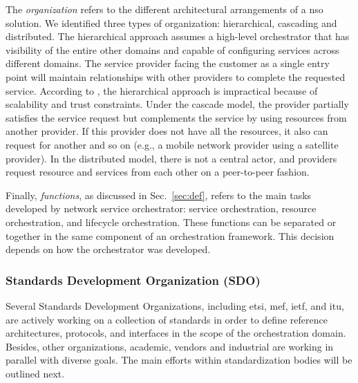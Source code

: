The \textit{organization} refers to the different architectural arrangements of a \gls{nso} solution. We identified three types of organization: hierarchical, cascading and distributed. The hierarchical approach assumes a high-level orchestrator that has visibility of the entire other domains and capable of configuring services across different domains. The service provider facing the customer as a single entry point will maintain relationships with other providers to complete the requested service. According to \cite{Bohn2011NISTArchitecture}, the hierarchical approach is impractical because of scalability and trust constraints.  
Under the cascade model, the provider partially satisfies the service request but complements the service by using resources from another provider. If this provider does not have all the resources, it also can request for another and so on (e.g., a mobile network provider using a satellite provider). In the distributed model, there is not a central actor, and providers request resource and services from each other on a peer-to-peer fashion.

Finally,  \textit{functions}, as discussed in Sec.~\ref{sec:def}, refers to the main tasks developed by network service orchestrator: service orchestration, resource orchestration, and lifecycle orchestration. These functions can be separated or together in the same component of an orchestration framework. This decision depends on how the orchestrator was developed.

\subsubsection{Standards Development Organization (SDO)}
Several Standards Development Organizations, including \gls{etsi}, \gls{mef}, \gls{ietf}, and \gls{itu}, are actively working on a collection of standards in order to define reference architectures, protocols, and interfaces in the scope of the orchestration domain. Besides, other organizations, academic, vendors and industrial are working in parallel with diverse goals. The main efforts within standardization bodies will be outlined next.